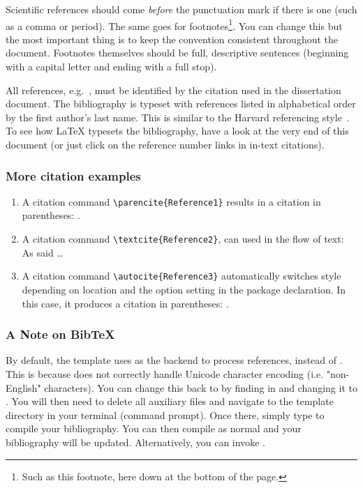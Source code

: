 Scientific references should come \emph{before} the punctuation mark if there is one (such as a comma or period). The same goes for footnotes\footnote{Such as this footnote, here down at the bottom of the page.}. You can change this but the most important thing is to keep the convention consistent throughout the document. Footnotes themselves should be full, descriptive sentences (beginning with a capital letter and ending with a full stop). 

All references, e.g.~\parencite{neville2010}, must be identified by the citation used in the dissertation document. The bibliography is typeset with references listed in alphabetical order by the first author's last name. This is similar to the Harvard referencing style~\parencite{york2010}. To see how \LaTeX{} typesets the bibliography, have a look at the very end of this document (or just click on the reference number links in in-text citations).

\subsubsection*{More citation examples}

\begin{enumerate}
	\item A citation command \texttt{\textbackslash parencite\{Reference1\}} results in a citation in parentheses: \parencite{Reference1}. 
	\item A citation command \texttt{\textbackslash textcite\{Reference2\}}, can used in the flow of text: As \textcite{Reference2} said \dots 
	\item A citation command \texttt{\textbackslash autocite\{Reference3\}} automatically switches style depending on location and the option setting in the package declaration. In this case, it produces a citation in parentheses: \autocite{Reference3}.
\end{enumerate}

\subsubsection*{A Note on BibTeX}

By default, the template uses  as the backend to process references, instead of . This is because  does not correctly handle Unicode character encoding (i.e. "non-English" characters). You can change this back to  by finding  in  and changing it to . You will then need to delete all auxiliary files and navigate to the template directory in your terminal (command prompt). Once there, simply type  to compile your bibliography. You can then compile  as normal and your bibliography will be updated. Alternatively, you can invoke .

